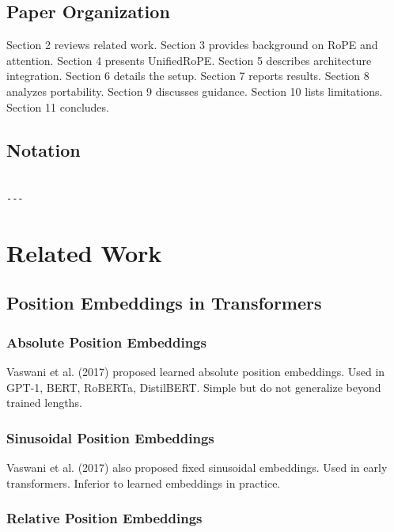 {\begin{itemize}
\end{itemize}
\subsection{Paper Organization}

Section 2 reviews related work. Section 3 provides background on RoPE and 
attention. Section 4 presents UnifiedRoPE. Section 5 describes 
architecture integration. Section 6 details the setup. Section 7 reports 
results. Section 8 analyzes portability. Section 9 discusses guidance. 
Section 10 lists limitations. Section 11 concludes.



\subsection{Notation}

\begin{lstlisting}

---
\end{lstlisting}


\section{Related Work}

\subsection{Position Embeddings in Transformers}

\subsubsection{Absolute Position Embeddings}

Vaswani et al. (2017) proposed learned absolute position embeddings. Used 
in GPT-1, BERT, RoBERTa, DistilBERT. Simple but do not generalize beyond 
trained lengths.

\subsubsection{Sinusoidal Position Embeddings}

Vaswani et al. (2017) also proposed fixed sinusoidal embeddings. Used in 
early transformers. Inferior to learned embeddings in practice.

\subsubsection{Relative Position Embeddings}

}
